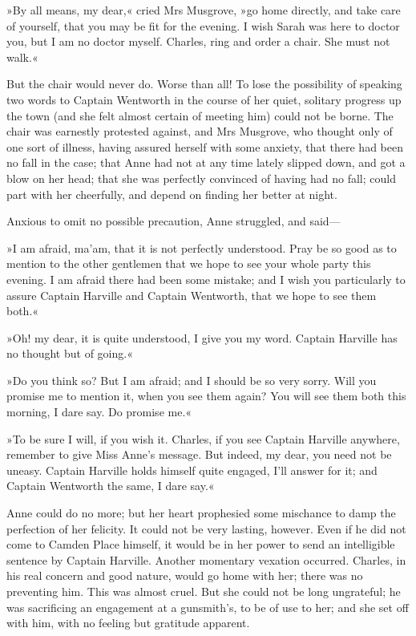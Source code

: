 »By all means, my dear,« cried Mrs Musgrove, »go home directly, and take care of yourself, that you may be fit for the evening. I wish Sarah was here to doctor you, but I am no doctor myself. Charles, ring and order a chair. She must not walk.«

But the chair would never do. Worse than all! To lose the possibility of speaking two words to Captain Wentworth in the course of her quiet, solitary progress up the town (and she felt almost certain of meeting him) could not be borne. The chair was earnestly protested against, and Mrs Musgrove, who thought only of one sort of illness, having assured herself with some anxiety, that there had been no fall in the case; that Anne had not at any time lately slipped down, and got a blow on her head; that she was perfectly convinced of having had no fall; could part with her cheerfully, and depend on finding her better at night.

Anxious to omit no possible precaution, Anne struggled, and said—

»I am afraid, ma'am, that it is not perfectly understood. Pray be so good as to mention to the other gentlemen that we hope to see your whole party this evening. I am afraid there had been some mistake; and I wish you particularly to assure Captain Harville and Captain Wentworth, that we hope to see them both.«

»Oh! my dear, it is quite understood, I give you my word. Captain Harville has no thought but of going.«

»Do you think so? But I am afraid; and I should be so very sorry. Will you promise me to mention it, when you see them again? You will see them both this morning, I dare say. Do promise me.«

»To be sure I will, if you wish it. Charles, if you see Captain Harville anywhere, remember to give Miss Anne's message. But indeed, my dear, you need not be uneasy. Captain Harville holds himself quite engaged, I'll answer for it; and Captain Wentworth the same, I dare say.«

Anne could do no more; but her heart prophesied some mischance to damp the perfection of her felicity. It could not be very lasting, however. Even if he did not come to Camden Place himself, it would be in her power to send an intelligible sentence by Captain Harville. Another momentary vexation occurred. Charles, in his real concern and good nature, would go home with her; there was no preventing him. This was almost cruel. But she could not be long ungrateful; he was sacrificing an engagement at a gunsmith's, to be of use to her; and she set off with him, with no feeling but gratitude apparent.

